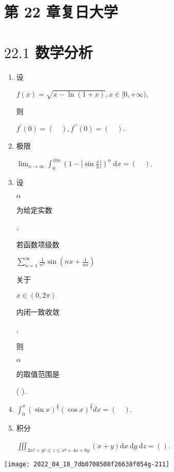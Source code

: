 \documentclass[10pt]{article}
\begin{document}
\section{第 22 章复日大学}
\section{$22.1$ 数学分析}
\begin{enumerate}
  \item \begin{CJK}{UTF8}{mj}设\end{CJK} $f(x)=\sqrt{x-\ln (1+x)}, x \in[0,+\infty)$, \begin{CJK}{UTF8}{mj}则\end{CJK} $f^{\prime}(0)=(\quad), f^{\prime \prime}(0)=(\quad)$.

  \item \begin{CJK}{UTF8}{mj}极限\end{CJK} $\lim _{n \rightarrow \infty} \int_{0}^{10 n}\left(1-\left|\sin \frac{x}{n}\right|\right)^{n} \mathrm{~d} x=(\quad)$.

  \item \begin{CJK}{UTF8}{mj}设\end{CJK} $\alpha$ \begin{CJK}{UTF8}{mj}为给定实数\end{CJK}, \begin{CJK}{UTF8}{mj}若函数项级数\end{CJK} $\sum_{n=1}^{\infty} \frac{1}{n^{\alpha}} \sin \left(n x+\frac{1}{n x}\right)$ \begin{CJK}{UTF8}{mj}关于\end{CJK} $x \in(0,2 \pi)$ \begin{CJK}{UTF8}{mj}内闭一致收敛\end{CJK}, \begin{CJK}{UTF8}{mj}则\end{CJK} $\alpha$ \begin{CJK}{UTF8}{mj}的取值范围是\end{CJK} ( ).

  \item $\int_{0}^{\pi}(\sin x)^{\frac{4}{3}}(\cos x)^{\frac{2}{3}} d x=(\quad)$.

  \item \begin{CJK}{UTF8}{mj}积分\end{CJK} $\iiint_{2 x^{2}+y^{2} \leqslant z \leqslant x^{2}+4 x+8 y}(x+y) \mathrm{d} x \mathrm{~d} y \mathrm{~d} z=()$.

\end{enumerate}
\texttt{[image: 2022\_04\_18\_7db0708508f26638f054g-211]}
\end{document}
